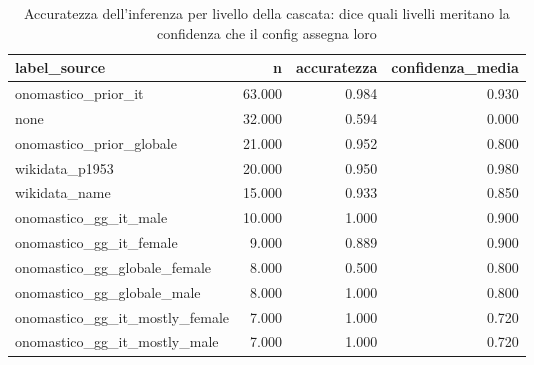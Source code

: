 \begin{table}
\centering
\caption{Accuratezza dell'inferenza per livello della cascata: dice quali livelli meritano la confidenza che il config assegna loro}
\label{tab:t2_validazione_per_fonte}
\begin{tabular}{lrrr}
\toprule
                  label\_source &      n &  accuratezza &  confidenza\_media \\
\midrule
           onomastico\_prior\_it & 63.000 &        0.984 &             0.930 \\
                          none & 32.000 &        0.594 &             0.000 \\
      onomastico\_prior\_globale & 21.000 &        0.952 &             0.800 \\
                wikidata\_p1953 & 20.000 &        0.950 &             0.980 \\
                 wikidata\_name & 15.000 &        0.933 &             0.850 \\
         onomastico\_gg\_it\_male & 10.000 &        1.000 &             0.900 \\
       onomastico\_gg\_it\_female &  9.000 &        0.889 &             0.900 \\
  onomastico\_gg\_globale\_female &  8.000 &        0.500 &             0.800 \\
    onomastico\_gg\_globale\_male &  8.000 &        1.000 &             0.800 \\
onomastico\_gg\_it\_mostly\_female &  7.000 &        1.000 &             0.720 \\
  onomastico\_gg\_it\_mostly\_male &  7.000 &        1.000 &             0.720 \\
\bottomrule
\end{tabular}
\end{table}
